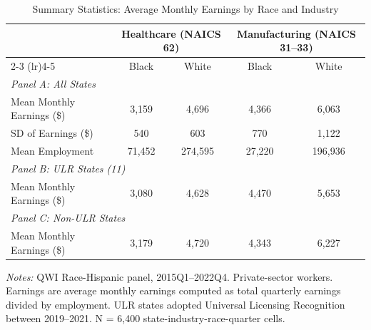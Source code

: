 \begin{table}[t]
\centering
\caption{Summary Statistics: Average Monthly Earnings by Race and Industry}
\label{tab:summary}
\begin{threeparttable}
\begin{tabular}{lcccc}
\toprule
 & \multicolumn{2}{c}{Healthcare (NAICS 62)} & \multicolumn{2}{c}{Manufacturing (NAICS 31--33)} \\
\cmidrule(lr){2-3} \cmidrule(lr){4-5}
 & Black & White & Black & White \\
\midrule
\multicolumn{5}{l}{\textit{Panel A: All States}} \\
Mean Monthly Earnings (\$) & 3,159 & 4,696 & 4,366 & 6,063 \\
SD of Earnings (\$) & 540 & 603 & 770 & 1,122 \\
Mean Employment & 71,452 & 274,595 & 27,220 & 196,936 \\
\midrule
\multicolumn{5}{l}{\textit{Panel B: ULR States (11)}} \\
Mean Monthly Earnings (\$) & 3,080 & 4,628 & 4,470 & 5,653 \\
\midrule
\multicolumn{5}{l}{\textit{Panel C: Non-ULR States}} \\
Mean Monthly Earnings (\$) & 3,179 & 4,720 & 4,343 & 6,227 \\
\bottomrule
\end{tabular}
\begin{tablenotes}[flushleft]\small
\item \textit{Notes:} QWI Race-Hispanic panel, 2015Q1--2022Q4. Private-sector workers. Earnings are average monthly earnings computed as total quarterly earnings divided by employment. ULR states adopted Universal Licensing Recognition between 2019--2021. N = 6,400 state-industry-race-quarter cells.
\end{tablenotes}
\end{threeparttable}
\end{table}

